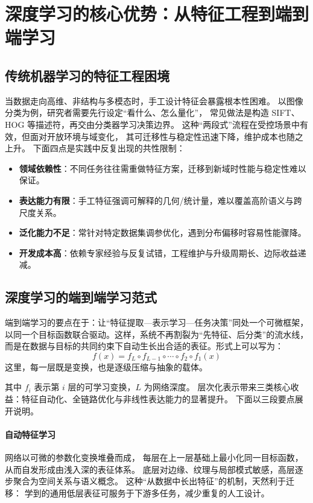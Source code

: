 \section{深度学习的核心优势：从特征工程到端到端学习}

\subsection{传统机器学习的特征工程困境}

当数据走向高维、非结构与多模态时，手工设计特征会暴露根本性困难。  
以图像分类为例，研究者需要先行设定“看什么、怎么量化”，  
常见做法是构造 SIFT、HOG 等描述符，再交由分类器学习决策边界。  
这种“两段式”流程在受控场景中有效，但面对开放环境与域变化，  
其可迁移性与稳定性迅速下降，维护成本也随之上升。  
下面四点是实践中反复出现的共性限制：

\begin{itemize}
\item {\bf 领域依赖性}：不同任务往往需重做特征方案，迁移到新域时性能与稳定性难以保证。
\item {\bf 表达能力有限}：手工特征强调可解释的几何/统计量，难以覆盖高阶语义与跨尺度关系。
\item {\bf 泛化能力不足}：常针对特定数据集调参优化，遇到分布偏移时容易性能骤降。
\item {\bf 开发成本高}：依赖专家经验与反复试错，工程维护与升级周期长、边际收益递减。
\end{itemize}

\subsection{深度学习的端到端学习范式}

端到端学习的要点在于：让“特征提取—表示学习—任务决策”同处一个可微框架，  
以同一个目标函数联合驱动。这样，系统不再割裂为“先特征、后分类”的流水线，  
而是在数据与目标的共同约束下自动生长出合适的表征。形式上可以写为：
\begin{equation}
f(x) = f_L \circ f_{L-1} \circ \cdots \circ f_2 \circ f_1(x)
\end{equation}
这里，每一层既是变换，也是逐级压缩与抽象的载体。

其中 $f_i$ 表示第 $i$ 层的可学习变换，$L$ 为网络深度。  
层次化表示带来三类核心收益：特征自动化、全链路优化与非线性表达能力的显著提升。  
下面以三段要点展开说明。

\paragraph{自动特征学习}
网络以可微的参数化变换堆叠而成，  
每层在上一层基础上最小化同一目标函数，从而自发形成由浅入深的表征体系。  
底层对边缘、纹理与局部模式敏感，高层逐步聚合为空间关系与语义概念。  
这种“从数据中长出特征”的机制，天然利于迁移：  
学到的通用低层表征可服务于下游多任务，减少重复的人工设计。

